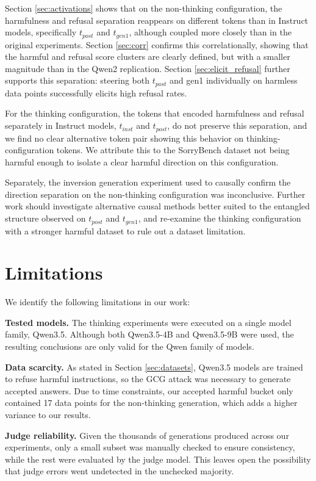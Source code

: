 \documentclass[nohyperref]{article}
\theoremstyle{plain}
\theoremstyle{definition}
\theoremstyle{remark}
\begin{document}
Section \ref{sec:activations} shows that on the non-thinking configuration, the harmfulness and refusal separation reappears on different tokens than in Instruct models, specifically $t_{post}$ and $t_{gen1}$, although coupled more closely than in the original experiments. Section \ref{sec:corr} confirms this correlationally, showing that the harmful and refusal score clusters are clearly defined, but with a smaller magnitude than in the Qwen2 replication. Section \ref{sec:elicit_refusal} further supports this separation: steering both $t_{post}$ and gen1 individually on harmless data points successfully elicits high refusal rates.

For the thinking configuration, the tokens that encoded harmfulness and refusal separately in Instruct models, $t_{inst}$ and $t_{post}$, do not preserve this separation, and we find no clear alternative token pair showing this behavior on thinking-configuration tokens. We attribute this to the SorryBench dataset not being harmful enough to isolate a clear harmful direction on this configuration.

Separately, the inversion generation experiment used to causally confirm the direction separation on the non-thinking configuration was inconclusive. Further work should investigate alternative causal methods better suited to the entangled structure observed on $t_{post}$ and $t_{gen1}$, and re-examine the thinking configuration with a stronger harmful dataset to rule out a dataset limitation.

\section{Limitations} We identify the following limitations in our work:

\textbf{Tested models.} The thinking experiments were executed on a single model family, Qwen3.5. Although both Qwen3.5-4B and Qwen3.5-9B were used, the resulting conclusions are only valid for the Qwen family of models.

\textbf{Data scarcity.} As stated in Section \ref{sec:datasets}, Qwen3.5 models are trained to refuse harmful instructions, so the GCG attack was necessary to generate accepted answers. Due to time constraints, our accepted harmful bucket only contained 17 data points for the non-thinking generation, which adds a higher variance to our results.

\textbf{Judge reliability.} Given the thousands of generations produced across our experiments, only a small subset was manually checked to ensure consistency, while the rest were evaluated by the judge model. This leaves open the possibility that judge errors went undetected in the unchecked majority.
\end{document}

